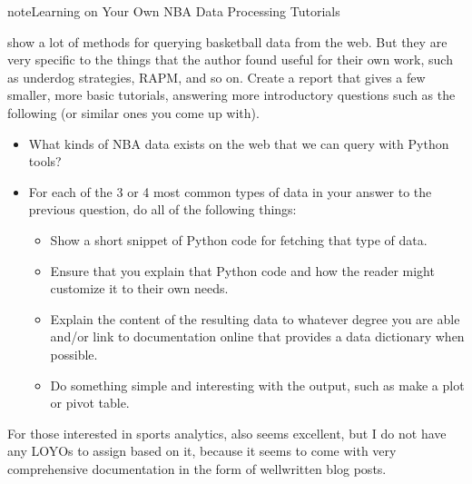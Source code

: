 \documentclass[letterpaper,10pt,english]{jupyterBook}
\begin{document}
\begin{sphinxadmonition}{note}{Learning on Your Own \sphinxhyphen{} NBA Data Processing Tutorials}

\sphinxAtStartPar
{} show a lot of methods for querying basketball data from the web.  But they are very specific to the things that the author found useful for their own work, such as underdog strategies, RAPM, and so on.  Create a report that gives a few smaller, more basic tutorials, answering more introductory questions such as the following (or similar ones you come up with).
\begin{itemize}
\item {} 
\sphinxAtStartPar
What kinds of NBA data exists on the web that we can query with Python tools?

\item {} 
\sphinxAtStartPar
For each of the 3 or 4 most common types of data in your answer to the previous question, do all of the following things:
\begin{itemize}
\item {} 
\sphinxAtStartPar
Show a short snippet of Python code for fetching that type of data.

\item {} 
\sphinxAtStartPar
Ensure that you explain that Python code and how the reader might customize it to their own needs.

\item {} 
\sphinxAtStartPar
Explain the content of the resulting data to whatever degree you are able and/or link to documentation online that provides a data dictionary when possible.

\item {} 
\sphinxAtStartPar
Do something simple and interesting with the output, such as make a plot or pivot table.

\end{itemize}

\end{itemize}
\end{sphinxadmonition}

\sphinxAtStartPar
For those interested in sports analytics,  also seems excellent, but I do not have any LOYOs to assign based on it, because it seems to come with very comprehensive documentation in the form of well\sphinxhyphen{}written blog posts.
\end{document}
